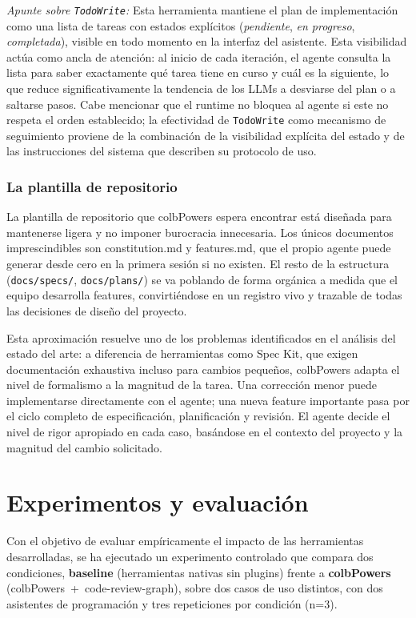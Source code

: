 \documentclass[11pt, letterpaper]{article}
\begin{document}
\medskip
\noindent\textit{Apunte sobre \texttt{TodoWrite}:} Esta herramienta mantiene el plan de implementación como una lista de tareas con estados explícitos (\textit{pendiente}, \textit{en progreso}, \textit{completada}), visible en todo momento en la interfaz del asistente. Esta visibilidad actúa como ancla de atención: al inicio de cada iteración, el agente consulta la lista para saber exactamente qué tarea tiene en curso y cuál es la siguiente, lo que reduce significativamente la tendencia de los LLMs a desviarse del plan o a saltarse pasos. Cabe mencionar que el runtime no bloquea al agente si este no respeta el orden establecido; la efectividad de \texttt{TodoWrite} como mecanismo de seguimiento proviene de la combinación de la visibilidad explícita del estado y de las instrucciones del sistema que describen su protocolo de uso.

\subsubsection{La plantilla de repositorio}
\label{sec:plantilla_repositorio}
La plantilla de repositorio que colbPowers espera encontrar está diseñada para mantenerse ligera y no imponer burocracia innecesaria. Los únicos documentos imprescindibles son constitution.md y features.md, que el propio agente puede generar desde cero en la primera sesión si no existen. El resto de la estructura (\texttt{docs/specs/}, \texttt{docs/plans/}) se va poblando de forma orgánica a medida que el equipo desarrolla features, convirtiéndose en un registro vivo y trazable de todas las decisiones de diseño del proyecto.

Esta aproximación resuelve uno de los problemas identificados en el análisis del estado del arte: a diferencia de herramientas como Spec Kit, que exigen documentación exhaustiva incluso para cambios pequeños, colbPowers adapta el nivel de formalismo a la magnitud de la tarea. Una corrección menor puede implementarse directamente con el agente; una nueva feature importante pasa por el ciclo completo de especificación, planificación y revisión. El agente decide el nivel de rigor apropiado en cada caso, basándose en el contexto del proyecto y la magnitud del cambio solicitado.

\newpage

\section{Experimentos y evaluación}
\label{sec:evaluacion_resultados}
Con el objetivo de evaluar empíricamente el impacto de las herramientas desarrolladas, se ha ejecutado un experimento controlado que compara dos condiciones, \textbf{baseline} (herramientas nativas sin plugins) frente a \textbf{colbPowers} (colbPowers~+~code-review-graph), sobre dos casos de uso distintos, con dos asistentes de programación y tres repeticiones por condición (n=3).
\end{document}
